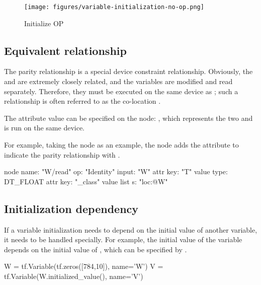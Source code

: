 \begin{content}
\begin{figure}[!h]
  \centering
  \texttt{[image: figures/variable-initialization-no-op.png]}
  \caption{Initialize OP}
  \label{fig:variable-initialization-no-op}
\end{figure}


\subsection{Equivalent relationship}
The parity relationship is a special device constraint relationship. Obviously, the   and  are extremely closely related, and the variables are modified and read separately. Therefore, they must be executed on the same device as ; such a relationship is often referred to as the co-location .

The  attribute value can be specified on the  node: \code{[s: "loc:@W"]}, which represents the two  and  is run on the same device.

For example, taking the  node as an example, the node adds the  attribute to indicate the parity relationship with .

\begin{leftbar}
\begin{python}
node {
  name: "W/read"
  op: "Identity"
  input: "W"
  attr {
    key: "T"
    value {
      type: DT_FLOAT
    }
  }
  attr {
    key: "_class"
    value {
      list {
        s: "loc:@W"
      }
    }
  }
}
\end{python}
\end{leftbar}


\subsection{Initialization dependency}
If a variable initialization needs to depend on the initial value of another variable, it needs to be handled specially. For example, the initial value of the variable  depends on the initial value of , which can be specified by .

\begin{leftbar}
\begin{python}
W = tf.Variable(tf.zeros([784,10]), name='W')
V = tf.Variable(W.initialized_value(), name='V')
\end{python}
\end{leftbar}


\end{content}
